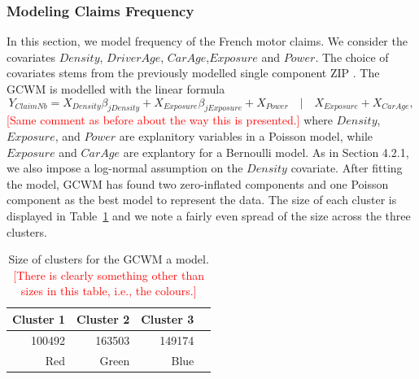 \documentclass[11pt,letterpaper]{article}
\numberwithin{equation}{section}
\numberwithin{equation}{section}
\numberwithin{equation}{section}
\begin{document}
 \subsubsection{Modeling Claims Frequency}

In this section, we model frequency of the French motor claims. We consider the covariates $Density$, $DriverAge$, $CarAge$,$Exposure$ and $Power$. The choice of covariates stems from the previously modelled single component ZIP \citep{Charpentier:2014}.
The GCWM is modelled with the linear formula
\begin{equation}
Y_{ClaimNb} = X_{Density}\beta_{jDensity} + X_{Exposure}\beta_{jExposure} + X_{Power} \quad|\quad X_{Exposure} + X_{Car Age},
\end{equation}
\textcolor{red}{[Same comment as before about the way this is presented.]}
where $Density$, $Exposure$, and $Power$ are explanitory variables in a Poisson model, while $Exposure$ and $Car Age$ are explantory for a Bernoulli model. As in Section 4.2.1, we also impose a log-normal assumption on the $Density$ covariate.
After fitting the model, GCWM has found two zero-inflated components and one Poisson component as the best model to represent the data. The size of each cluster is displayed in Table~\ref{table:sizeFreq} and we note a fairly even spread of the size across the three clusters.
\begin{table}[!htb]
\centering
\caption{Size of clusters for the GCWM a model. \textcolor{red}{[There is clearly something other than sizes in this table, i.e., the colours.]}}
\label{table:sizeFreq}
\begin{tabular}{rrrr}
\hline
Cluster 1   & Cluster 2  & Cluster 3   \\
\hline
100492 & 163503 & 149174 \\
Red & Green & Blue  \\
\hline
\end{tabular}
\end{table}
\end{document}
